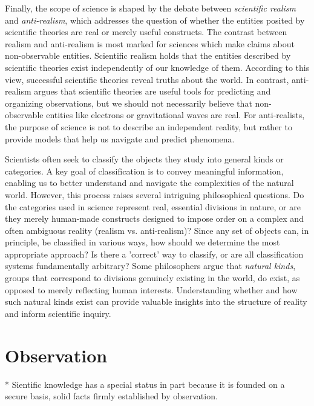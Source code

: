 Finally, the scope of science is shaped by the debate between \emph{scientific realism} and \emph{anti-realism}, which addresses the question of whether the entities posited by scientific theories are real or merely useful constructs. The contrast between realism and anti-realism is most marked for sciences which make claims about non-observable entities. Scientific realism holds that the entities described by scientific theories exist independently of our knowledge of them. According to this view, successful scientific theories reveal truths about the world. In contrast, anti-realism argues that scientific theories are useful tools for predicting and organizing observations, but we should not necessarily believe that non-observable entities like electrons or gravitational waves are real. For anti-realists, the purpose of science is not to describe an independent reality, but rather to provide models that help us navigate and predict phenomena.

Scientists often seek to classify the objects they study into general kinds or categories. A key goal of classification is to convey meaningful information, enabling us to better understand and navigate the complexities of the natural world. However, this process raises several intriguing philosophical questions. Do the categories used in science represent real, essential divisions in nature, or are they merely human-made constructs designed to impose order on a complex and often ambiguous reality (realism vs. anti-realism)? Since any set of objects can, in principle, be classified in various ways, how should we determine the most appropriate approach? Is there a 'correct' way to classify, or are all classification systems fundamentally arbitrary? Some philosophers argue that \emph{natural kinds}, groups that correspond to divisions genuinely existing in the world, do exist, as opposed to merely reflecting human interests. Understanding whether and how such natural kinds exist can provide valuable insights into the structure of reality and inform scientific inquiry.

%
%
\section{Observation}

* Sientific knowledge has a special status in part because it is founded on a secure basis, solid facts firmly established by observation.

